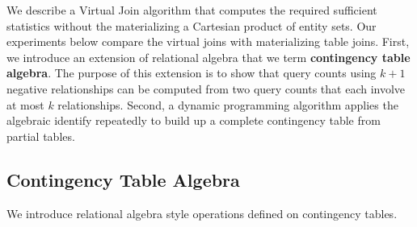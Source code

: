 \documentclass{acm_proc_article-sp}
\newcommand{\ct}{\mathit{ct}}
\begin{document}
We describe a Virtual Join algorithm that computes the required sufficient statistics without the materializing a Cartesian product of entity sets. Our experiments below compare the virtual joins with materializing table joins. 
First, we introduce an  extension of relational algebra that we term \textbf{contingency table algebra}. The purpose of this extension is to 
show that query counts using $k+1$ negative relationships can be computed from two query counts that each involve at most $k$ relationships. 
Second, a dynamic programming algorithm applies the algebraic identify repeatedly to build up a complete contingency table from partial tables.


\subsection{Contingency Table Algebra} \label{sec:cta}
We introduce relational algebra style operations defined on contingency tables.

\end{document}
